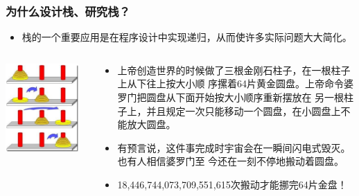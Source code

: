 \begin{frame}[fragile]
  \frametitle{为什么设计栈、研究栈？}
  \scriptsize
  \begin{itemize}
  \item 栈的一个重要应用是在程序设计中实现递归，从而使许多实际问题大大简化。
  \end{itemize}

  \begin{columns}
    \begin{column}[T]{0.5\linewidth}
      \includegraphics[width=0.9\textwidth]{figs/stack/Tower-Of-Hanoi-1.png}
    \end{column}
    \begin{column}[T]{0.5\linewidth}
        \begin{itemize}
        \item 上帝创造世界的时候做了三根金刚石柱子，在一根柱子上从下往上按大小顺
          序摞着64片黄金圆盘。上帝命令婆罗门把圆盘从下面开始按大小顺序重新摆放在
          另一根柱子上，并且规定一次只能移动一个圆盘，在小圆盘上不能放大圆盘。
        \item 有预言说，这件事完成时宇宙会在一瞬间闪电式毁灭。也有人相信婆罗门至
          今还在一刻不停地搬动着圆盘。
        \item \color{red} 18,446,744,073,709,551,615次搬动才能挪完64片金盘！
        \end{itemize}
    \end{column}
  \end{columns}
\end{frame}

